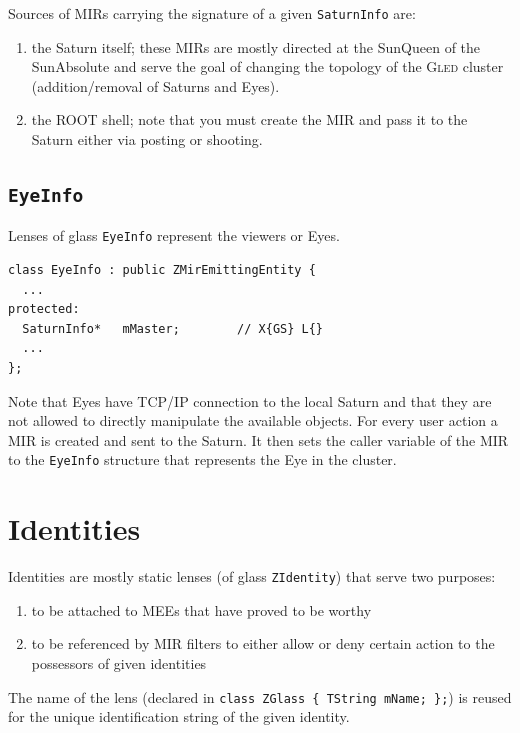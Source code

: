 \documentclass[a4paper,11pt]{article}
\def\gled{\textsc{Gled}\xspace}
\def\smalltt#1{{\small\texttt{#1}}}
\begin{document}
Sources of MIRs carrying the signature of a given \smalltt{SaturnInfo}
are:
\begin{enumerate}\parsep=0pt\itemsep=0pt
\item the Saturn itself; these MIRs are mostly directed at the
  SunQueen of the SunAbsolute and serve the goal of changing the
  topology of the \gled cluster (addition/removal of
  Saturns and Eyes).
\item the ROOT shell; note that you must create the MIR and pass it to
  the Saturn either via posting or shooting.
\end{enumerate}


\subsection{\smalltt{EyeInfo}}

Lenses of glass \smalltt{EyeInfo} represent the viewers or Eyes. 

{\footnotesize\begin{verbatim}
class EyeInfo : public ZMirEmittingEntity {
  ...
protected:
  SaturnInfo*   mMaster;        // X{GS} L{}
  ...
};
\end{verbatim}
}

Note that Eyes have TCP/IP connection to the local Saturn and that
they are not allowed to directly manipulate the available objects. For
every user action a MIR is created and sent to the Saturn. It then
sets the caller variable of the MIR to the \smalltt{EyeInfo} structure
that represents the Eye in the cluster.


\section{Identities}

Identities are mostly static lenses (of glass \smalltt{ZIdentity})
that serve two purposes:
\begin{enumerate}\parsep=0pt\itemsep=0pt
\item to be attached to MEEs that have proved to be worthy
\item to be referenced by MIR filters to either allow or deny certain
  action to the possessors of given identities
\end{enumerate}
The name of the lens (declared in \smalltt{class ZGlass\,\{\,TString
    mName;\,\};}) is reused for the unique identification string of the
given identity.
\end{document}
